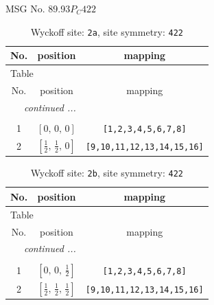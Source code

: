 \documentclass[fleqn,8pt]{jsarticle}
\begin{document}
\setcounter{MaxMatrixCols}{32}

\renewcommand{\tablename}{Table~}
\renewcommand{\figurename}{Figure~}
\begin{center}
\LARGE
MSG No. 89.93\quad$P_{C}422$
\end{center}
\renewcommand{\arraystretch}{1.2}
\begin{longtable}{ccc}
\caption{Wyckoff site: {\tt 2a}, site symmetry: {\tt 422}}
 \\
 \hline \hline
No. & position & mapping \\ \hline \endfirsthead

\multicolumn{2}{l}{\tablename\ \thetable{}} \\
 \hline \hline
No. & position & mapping \\ \hline \endhead

 \hline \hline
\multicolumn{2}{r}{\footnotesize\it continued ...} \\ \endfoot

 \hline \hline
\multicolumn{2}{r}{} \\ \endlastfoot

1 & $\left[ 0,\, 0,\, 0 \right]$ & {\tt [1,2,3,4,5,6,7,8]} \\ \hline
2 & $\left[ \frac{1}{2},\, \frac{1}{2},\, 0 \right]$ & {\tt [9,10,11,12,13,14,15,16]} \\
\end{longtable}
\renewcommand{\arraystretch}{1.2}
\begin{longtable}{ccc}
\caption{Wyckoff site: {\tt 2b}, site symmetry: {\tt 422}}
 \\
 \hline \hline
No. & position & mapping \\ \hline \endfirsthead

\multicolumn{2}{l}{\tablename\ \thetable{}} \\
 \hline \hline
No. & position & mapping \\ \hline \endhead

 \hline \hline
\multicolumn{2}{r}{\footnotesize\it continued ...} \\ \endfoot

 \hline \hline
\multicolumn{2}{r}{} \\ \endlastfoot

1 & $\left[ 0,\, 0,\, \frac{1}{2} \right]$ & {\tt [1,2,3,4,5,6,7,8]} \\ \hline
2 & $\left[ \frac{1}{2},\, \frac{1}{2},\, \frac{1}{2} \right]$ & {\tt [9,10,11,12,13,14,15,16]} \\
\end{longtable}
\end{document}
